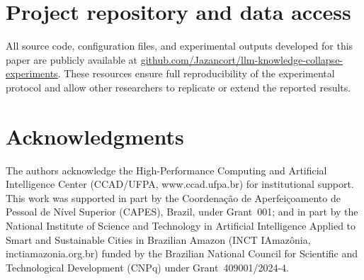 \documentclass[a4paper,fleqn]{cas-dc}
\begin{document}
\printcredits

\appendix

\section{Project repository and data access}\label{app:repo}

All source code, configuration files, and experimental outputs developed for
this paper are publicly available at
\href{https://github.com/Jazancort/llm-knowledge-collapse-experiments}{github.com/Jazancort/llm-knowledge-collapse-experiments}.
These resources ensure full reproducibility of the experimental protocol and
allow other researchers to replicate or extend the reported results.

\section*{Acknowledgments}

The authors acknowledge the High-Performance Computing and Artificial
Intelligence Center (CCAD/UFPA, www.ccad.ufpa.br) for institutional support.
This work was supported in part by the Coordena\c{c}\~{a}o de
Aperfei\c{c}oamento de Pessoal de N\'{i}vel Superior (CAPES), Brazil,
under Grant~001; and in part by the National Institute of Science and
Technology in Artificial Intelligence Applied to Smart and Sustainable Cities
in Brazilian Amazon (INCT IAmazônia, inctiamazonia.org.br) funded by the
Brazilian National Council for Scientific and Technological Development (CNPq)
under Grant~409001/2024-4.



\end{document}

